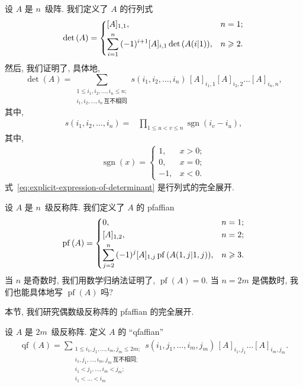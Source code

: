 \documentclass[../libro.tex]{subfiles}
\begin{document}
设 \(A\) 是 \(n\)~级阵.
我们定义了 \(A\) 的行列式
\begin{align*}
    \det {(A)}
    =
    \begin{dcases}
        [A]_{1,1},
        & n = 1;    \\
        \sum_{i = 1}^{n}
        {(-1)^{i+1} [A]_{i,1} \det {(A(i|1))}},
        & n \geq 2.
    \end{dcases}
\end{align*}
然后, 我们证明了, 具体地,
\begin{equation}
    \det {(A)}
    =
    \sum_{\substack{
            1 \leq i_1, i_2, \dots, i_n \leq n; \\
            i_1, i_2, \dots, i_n\,\text{互不相同}
    }}
    {s(i_1, i_2, \dots, i_n)\,
    [A]_{i_1,1} [A]_{i_2,2} \dots [A]_{i_n,n}},
    \label{eq:explicit-expression-of-determinant}
\end{equation}
其中,
\begin{align*}
    s(i_1, i_2, \dots, i_n)
    = {} & \prod_{1 \leq u < v \leq n}
    {\operatorname{sgn} {(i_v - i_u)}},
\end{align*}
其中,
\begin{align*}
    \operatorname{sgn} {(x)} =
    \begin{cases}
        1,  & x > 0; \\
        0,  & x = 0; \\
        -1, & x < 0.
    \end{cases}
\end{align*}
式~\eqref{eq:explicit-expression-of-determinant}
是行列式的完全展开.

设 \(A\) 是 \(n\)~级反称阵.
我们定义了 \(A\) 的 pfaffian
\begin{align*}
    \operatorname{pf} {(A)} =
    \begin{dcases}
        0,
        & n = 1;    \\
        [A]_{1,2},
        & n = 2;    \\
        \sum_{j = 2}^{n}
        {(-1)^{j} [A]_{1,j}
        \operatorname{pf} {(A({1,j}|{1,j}))}},
        & n \geq 3.
    \end{dcases}
\end{align*}
当 \(n\) 是奇数时,
我们用数学归纳法证明了,
\(\operatorname{pf} {(A)} = 0\).
当 \(n = 2m\) 是偶数时,
我们也能具体地写 \(\operatorname{pf} {(A)}\) 吗?

本节, 我们研究偶数级反称阵的 pfaffian 的完全展开.

\begin{definition}
    设 \(A\) 是 \(2m\)~级反称阵.
    定义 \(A\) 的 ``qfaffian''
    \begin{align*}
        \operatorname{qf} {(A)}
        = \sum_{\substack{
                1 \leq i_1, j_1, \dots, i_m, j_m \leq 2m;   \\
                i_1, j_1, \dots, i_m, j_m\,\text{互不相同}; \\
                i_1 < j_1, \dots, i_m < j_m;                \\
                i_1 < \dots < i_m
        }}
        {s(i_1, j_1, \dots, i_m, j_m)\,
        [A]_{i_1,j_1} \dots [A]_{i_m,j_m}}.
    \end{align*}
\end{definition}
\end{document}
